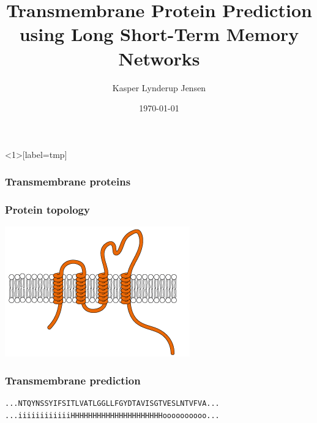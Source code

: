 \documentclass{beamer}
\title{Transmembrane Protein Prediction using Long Short-Term Memory Networks}
\author{Kasper Lynderup Jensen}
\date{\today}
\begin{document}
\begin{frame}
\maketitle
\end{frame}

\begin{frame}<1>[label=tmp]
\frametitle<1>{Transmembrane proteins}
\frametitle<2>{Protein topology}
\centering
\includegraphics[width=\textwidth]{tmp.png}
\end{frame}

\begin{frame}[fragile, label=tmpp]
\frametitle{Transmembrane prediction}
\centering
\begin{BVerbatim}
...NTQYNSSYIFSITLVATLGGLLFGYDTAVISGTVESLNTVFVA...
...iiiiiiiiiiiiHHHHHHHHHHHHHHHHHHHHHoooooooooo...
\end{BVerbatim}
\end{frame}
\end{document}
